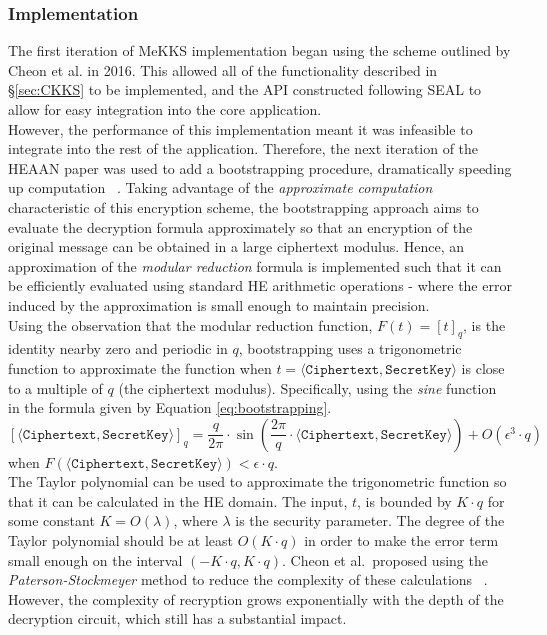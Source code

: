 \subsubsection{Implementation}
\setlength{\leftskip}{0.5cm}
\indent \indent
The first iteration of MeKKS implementation began using the scheme outlined by Cheon et al. in 2016. This allowed all of the functionality described in §\ref{sec:CKKS} to be implemented, and the API constructed following SEAL to allow for easy integration into the core application.
\smallskip \\ \indent
However, the performance of this implementation meant it was infeasible to integrate into the rest of the application. Therefore, the next iteration of the HEAAN paper was used to add a bootstrapping procedure, dramatically speeding up computation ~\cite{BootstrappingHEAAN}. Taking advantage of the \textit{approximate computation} characteristic of this encryption scheme, the bootstrapping approach aims to evaluate the decryption formula approximately so that an encryption of the original message can be obtained in a large ciphertext modulus. Hence, an approximation of the \textit{modular reduction} formula is implemented such that it can be efficiently evaluated using standard HE arithmetic operations - where the error induced by the approximation is small enough to maintain precision.
\smallskip \\ \indent
Using the observation that the modular reduction function, $F(t) = [t]_q$, is the identity nearby zero and periodic in $q$, bootstrapping uses a trigonometric function to approximate the function when $t = \langle \texttt{Ciphertext}, \texttt{SecretKey} \rangle$ is close to a multiple of $q$ (the ciphertext modulus). Specifically, using the \textit{sine} function in the formula given by Equation \ref{eq:bootstrapping}.
\begin{equation}
    \label{eq:bootstrapping}
    [\langle \texttt{Ciphertext}, \texttt{SecretKey} \rangle]_q = \frac{q}{2 \pi} \cdot \sin \left( \frac{2 \pi}{q} \cdot \langle \texttt{Ciphertext}, \texttt{SecretKey} \rangle \right) + O(\epsilon^3 \cdot q)
\end{equation}
when $F(\langle \texttt{Ciphertext}, \texttt{SecretKey} \rangle) < \epsilon \cdot q$.
\smallskip \\ \indent
The Taylor polynomial can be used to approximate the trigonometric function so that it can be calculated in the HE domain. The input, $t$, is bounded by $K \cdot q$ for some constant $K = O(\lambda)$, where $\lambda$ is the security parameter. The degree of the Taylor polynomial should be at least $O(K \cdot q)$ in order to make the error term small enough on the interval $(-K \cdot q, K \cdot q)$. Cheon et al.\ proposed using the \textit{Paterson-Stockmeyer} method to reduce the complexity of these calculations ~\cite{BootstrappingHEAAN, Paterson}. However, the complexity of recryption grows exponentially with the depth of the decryption circuit, which still has a substantial impact.

